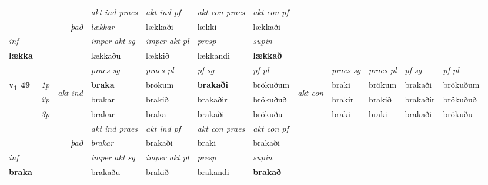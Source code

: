 \begin{longtable}[l]{X>{\footnotesize\itshape}llXXXXlXXXX}
   && &  \textit{akt ind praes} & \textit{akt ind pf} & \textit{akt con praes} & \textit{akt con pf} \\*
\multicolumn{3}{r}{\textit{það}} & lækkar & lækkaði & lækki & lækkaði \\*

\cmidrule{4-7}
   {\textit{inf}} & &  & \textit{imper akt sg} & \textit{imper akt pl}   & \textit{presp} & \textit{supin}   \\*
  {\textbf{lækka}} & && lækkaðu  & lækkið   & lækkandi &  \textbf{lækkað}   \\*

\midrule

 & &   & \textit{praes sg}  & \textit{praes pl}    & \textit{ pf sg} & \textit{pf pl} & & \textit{praes sg}  & \textit{praes pl}    & \textit{pf sg} & \textit{pf pl }  \\ \cmidrule{4-7} \cmidrule{9-12}
 \multirow{2}{*}{{{\textbf{v{\textsubscript{1}}} \Large{\textbf{49}}}}}  & 1p & \multirow{3}{*}{\begin{turn}{90}\textit{akt ind}\end{turn}} & \textbf{braka} & brökum & \textbf{brakaði} & brökuðum & \multirow{3}{*}{\begin{turn}{90}\textit{akt con}\end{turn}} &braki & brökum & brakaði & brökuðum\\*
 & 2p &  &  brakar  & brakið & brakaðir & brökuðuð & & brakir & brakið & brakaðir & brökuðuð \\*
 & 3p &  & brakar & braka & brakaði & brökuðu & & braki & braki& brakaði & brökuðu \\*
\cmidrule{4-7} \cmidrule{9-12}

   && &  \textit{akt ind praes} & \textit{akt ind pf} & \textit{akt con praes} & \textit{akt con pf} \\*
\multicolumn{3}{r}{\textit{það}} & brakar & brakaði & braki & brakaði \\*

\cmidrule{4-7}
   {\textit{inf}} & &  & \textit{imper akt sg} & \textit{imper akt pl}   & \textit{presp} & \textit{supin}   \\*
  {\textbf{braka}} & && brakaðu  & brakið   & brakandi &  \textbf{brakað}   \\*

\midrule


\end{longtable}
